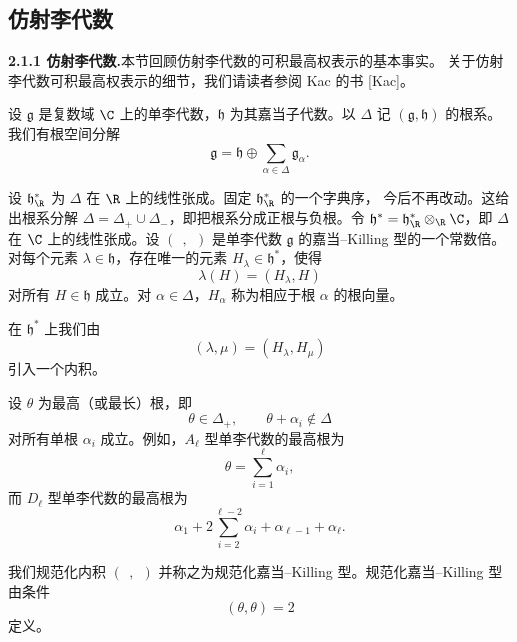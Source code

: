 
\subsection{仿射李代数}


\noindent\textbf{2.1.1 仿射李代数.}\quad 本节回顾仿射李代数的可积最高权表示的基本事实。
关于仿射李代数可积最高权表示的细节，我们请读者参阅 Kac 的书 [Kac]。

设 $\mathfrak{g}$ 是复数域 $\C$ 上的单李代数，$\mathfrak{h}$ 为其嘉当子代数。以 $\Delta$ 记
$(\mathfrak{g},\mathfrak{h})$ 的根系。我们有根空间分解
\[
\mathfrak{g}=\mathfrak{h}\oplus\sum_{\alpha\in\Delta}\mathfrak{g}_{\alpha}.
\]

设 $\mathfrak{h}^*_{\R}$ 为 $\Delta$ 在 $\R$ 上的线性张成。固定 $\mathfrak{h}^*_{\R}$ 的一个字典序，
今后不再改动。这给出根系分解 $\Delta=\Delta_+\cup\Delta_-$，即把根系分成正根与负根。令
$\mathfrak{h}^*=\mathfrak{h}^*_{\R}\otimes_{\R}\C$，即 $\Delta$ 在 $\C$ 上的线性张成。设
$(\;\,,\;\,)$ 是单李代数 $\mathfrak{g}$ 的嘉当--Killing 型的一个常数倍。对每个元素
$\lambda\in\mathfrak{h}$，存在唯一的元素 $H_{\lambda}\in\mathfrak{h}^*$，使得
\[
\lambda(H)=(H_{\lambda},H)
\]
对所有 $H\in\mathfrak{h}$ 成立。对 $\alpha\in\Delta$，$H_{\alpha}$ 称为相应于根 $\alpha$ 的根向量。

在 $\mathfrak{h}^*$ 上我们由
\begin{equation}
(\lambda,\mu)=(H_{\lambda},H_{\mu}) \tag{2.1}
\end{equation}
引入一个内积。

设 $\theta$ 为最高（或最长）根，即
\[
\theta\in\Delta_+,\qquad \theta+\alpha_i\notin\Delta
\]
对所有单根 $\alpha_i$ 成立。例如，$A_{\ell}$ 型单李代数的最高根为
\[
\theta=\sum_{i=1}^{\ell}\alpha_i,
\]
而 $D_{\ell}$ 型单李代数的最高根为
\[
\alpha_1+2\sum_{i=2}^{\ell-2}\alpha_i+\alpha_{\ell-1}+\alpha_{\ell}.
\]

我们规范化内积 $(\;\,,\;\,)$ 并称之为规范化嘉当--Killing 型。规范化嘉当--Killing 型由条件
\begin{equation}
(\theta,\theta)=2 \tag{2.2}
\end{equation}
定义。

